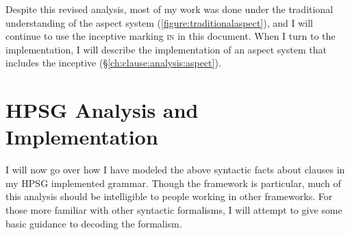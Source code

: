 \begin{comment}
\ex \label{ex:mul1}
\begingl
\glpreamble mułaa //
\gla muł-(y)aˑ //
\glb tide.comes.in-\textsc{cv} //
\glft tide starting to come up (\textbf{N}, Fidelia Haiyupis & \textsc{B}, Bob Mundy) //
\endgl
\xe

\ex \label{ex:mul2}
\begingl
\glpreamble muułšiƛ //
\gla muł-šiƛ-LS(?) //
\glb tide.comes.in-\textsc{mo}-\textsc{grad}(?) //
\glft tide coming in (\textbf{N}, Fidelia Haiyupis & \textsc{B}, Bob Mundy) //
\endgl
\xe

\ex \label{ex:mul3}
\begingl
\glpreamble mułiičiƛ //
\gla muł-a-LS //
\glb tide.comes.in-\textsc{mo}-\textsc{grad} //
\glft tide coming in (\textbf{N}, Fidelia Haiyupis & \textsc{B}, Bob Mundy) //
\endgl
\xe
\end{comment}




Despite this revised analysis, most of my work was done under the traditional understanding of the aspect system (\cref{figure:traditionalaspect}), and I will continue to use the inceptive marking \textsc{in} in this document. When I turn to the implementation, I will describe the implementation of an aspect system that includes the inceptive (\S\ref{ch:clause:analysis:aspect}).

\section{HPSG Analysis and Implementation} \label{ch:clause:analysis}

I will now go over how I have modeled the above syntactic facts about clauses in my HPSG implemented grammar. Though the framework is particular, much of this analysis should be intelligible to people working in other frameworks. For those more familiar with other syntactic formalisms, I will attempt to give some basic guidance to decoding the formalism.


